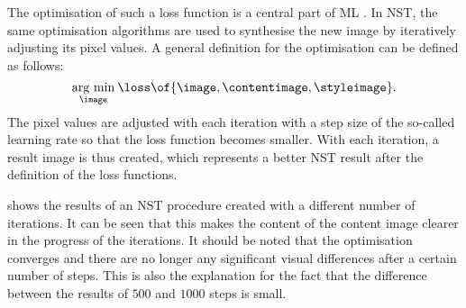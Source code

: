The optimisation of such a loss function \loss{} is a central part of \gls{ML} \cite{Alp2020}. In \gls{NST}, the same optimisation algorithms are used to synthesise the new image \image{} by iteratively adjusting its pixel values. A general definition for the optimisation can be defined as follows:
\begin{equation*}
	\argmin{\image}{\loss\of{\image\eqcommasep \contentimage\eqcommasep \styleimage}} \eqtextdot
\end{equation*} 
The pixel values are adjusted with each iteration with a step size of the so-called learning rate so that the loss function becomes smaller. With each iteration, a result image is thus created, which represents a better \gls{NST} result after the definition of the loss functions.
 
 shows the results of an \gls{NST} procedure created with a different number of iterations. It can be seen that this makes the content of the content image clearer in the progress of the iterations. It should be noted that the optimisation converges and there are no longer any significant visual differences after a certain number of steps. This is also the explanation for the fact that the difference between the results of $500$ and $1000$ steps is small. 

